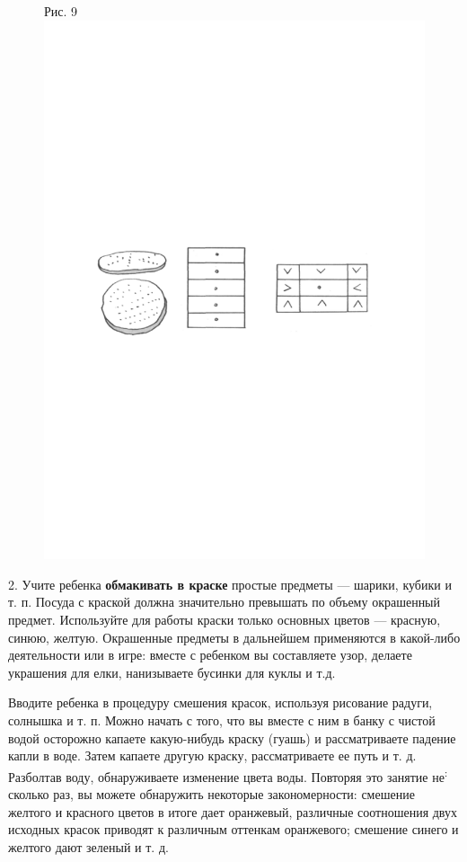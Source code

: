\documentclass[a5paper]{book}
\begin{document}
\begin{figure}
\centering
Рис. 9 \includegraphics[width=\linewidth]{media/media/image9.png}
\end{figure}

2. Учите ребенка \textbf{обмакивать в краске} простые предметы ---
шарики, кубики и т. п. Посуда с краской должна значительно превышать по
объему окрашенный предмет. Используйте для работы краски только основных
цветов --- красную, синюю, желтую. Окрашенные предметы в дальнейшем
применяются в какой-либо деятельности или в игре: вместе с ребенком вы
составляете узор, делаете украшения для елки, нанизываете бусинки для
куклы и т.д.

Вводите ребенка в процедуру смешения красок, используя рисование радуги,
солнышка и т. п. Можно начать с того, что вы вместе с ним в банку с
чистой водой осторожно капаете какую-нибудь краску (гуашь) и
рассматриваете падение капли в воде. Затем капаете другую краску,
рассматриваете ее путь и т. д. Разболтав воду, обнаруживаете изменение
цвета воды. Повторяя это занятие не\textsuperscript{:} сколько раз, вы
можете обнаружить некоторые закономерности: смешение желтого и красного
цветов в итоге дает оранжевый, различные соотношения двух исходных
красок приводят к различным оттенкам оранжевого; смешение синего и
желтого дают зеленый и т. д.
\end{document}
